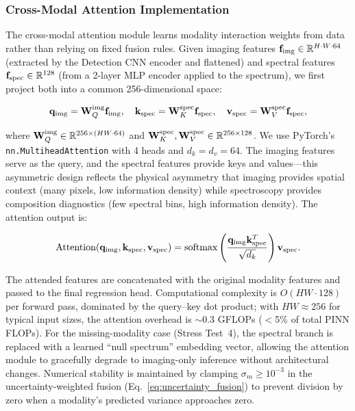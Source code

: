 \documentclass[usenatbib]{mnras}
\begin{document}
\subsubsection{Cross-Modal Attention Implementation}\label{sec:fusion}

The cross-modal attention module learns modality interaction weights from data rather than relying on fixed fusion rules. Given imaging features $\mathbf{f}_{\rm img} \in \mathbb{R}^{H \cdot W \cdot 64}$ (extracted by the Detection CNN encoder and flattened) and spectral features $\mathbf{f}_{\rm spec} \in \mathbb{R}^{128}$ (from a 2-layer MLP encoder applied to the spectrum), we first project both into a common 256-dimensional space:

\begin{equation}
\mathbf{q}_{\rm img} = \mathbf{W}_Q^{\rm img} \mathbf{f}_{\rm img}, \quad
\mathbf{k}_{\rm spec} = \mathbf{W}_K^{\rm spec} \mathbf{f}_{\rm spec}, \quad
\mathbf{v}_{\rm spec} = \mathbf{W}_V^{\rm spec} \mathbf{f}_{\rm spec},
\end{equation}

where $\mathbf{W}_Q^{\rm img} \in \mathbb{R}^{256 \times (HW\cdot 64)}$ and $\mathbf{W}_K^{\rm spec}, \mathbf{W}_V^{\rm spec} \in \mathbb{R}^{256 \times 128}$. We use PyTorch's \texttt{nn.MultiheadAttention} with 4 heads and $d_k = d_v = 64$. The imaging features serve as the query, and the spectral features provide keys and values---this asymmetric design reflects the physical asymmetry that imaging provides spatial context (many pixels, low information density) while spectroscopy provides composition diagnostics (few spectral bins, high information density). The attention output is:

\begin{equation}
\text{Attention}(\mathbf{q}_{\rm img}, \mathbf{k}_{\rm spec}, \mathbf{v}_{\rm spec}) = \text{softmax}\left(\frac{\mathbf{q}_{\rm img} \mathbf{k}_{\rm spec}^T}{\sqrt{d_k}}\right) \mathbf{v}_{\rm spec}.
\end{equation}

The attended features are concatenated with the original modality features and passed to the final regression head. Computational complexity is $O(HW \cdot 128)$ per forward pass, dominated by the query--key dot product; with $HW \approx 256$ for typical input sizes, the attention overhead is $\sim$0.3 GFLOPs ($<$5\% of total PINN FLOPs). For the missing-modality case (Stress Test~4), the spectral branch is replaced with a learned ``null spectrum'' embedding vector, allowing the attention module to gracefully degrade to imaging-only inference without architectural changes. Numerical stability is maintained by clamping $\sigma_m \geq 10^{-3}$ in the uncertainty-weighted fusion (Eq.~\ref{eq:uncertainty_fusion}) to prevent division by zero when a modality's predicted variance approaches zero.
\end{document}
